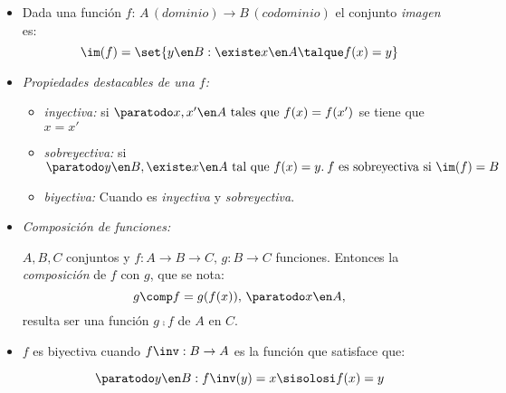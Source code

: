 \begin{itemize}[label={\tiny{}}]
\begin{itemize}[label=\tiny{}]
                \begin{itemize}[label=\tiny{}]
                  \item Dada una función $f:\, A\,(dominio) \to B\,(codominio)$
                        el conjunto \textit{imagen} es:
                        $$
                          \im(f)= \set{y \en B : \existe x \en A \talque f(x) = y}
                        $$

                  \item \textit{Propiedades destacables de una $f$:}
                        \begin{itemize}[label=\tiny{}]
                          \item \textit{inyectiva:} si $\paratodo x, x' \en A \text{ tales que } f(x) = f(x')$ se tiene que $ x = x'$
                          \item \textit{sobreyectiva:} si $\paratodo y \en B, \existe x \en A \text{ tal que } f(x) = y.\: f\text{ es sobreyectiva si } \im(f) = B$
                          \item \textit{biyectiva:} Cuando es \textit{inyectiva} y \textit{sobreyectiva}.
                        \end{itemize}

                  \item \textit{Composición de funciones:}\par
                        $A, B, C$ conjuntos y $f: A \to B \to C,\, g: B \to C$ funciones. Entonces la \textit{composición} de $f$ con $g$, que se nota:
                        $$
                          g \comp f = g(f(x)),\, \paratodo x \en A,
                        $$
                        resulta ser una función $g \comp f$ de $A$ en $C$.

                  \item $f$ es biyectiva cuando $f\inv : B \to A$ es la función que satisface que:\par
                        $$
                          \paratodo y \en B: f\inv(y) = x \sisolosi f(x) = y
                        $$
                \end{itemize}
        \end{itemize}
\end{itemize}
